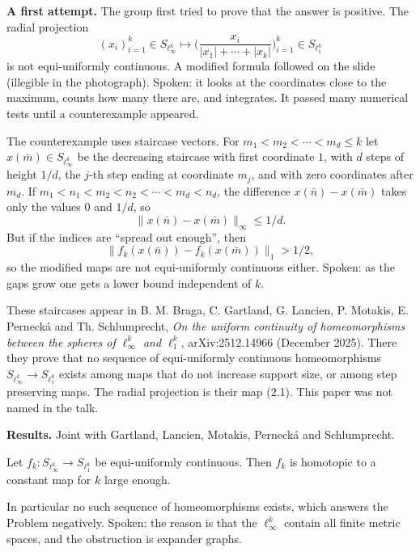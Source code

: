 \medskip\noindent
{\bf A first attempt.} The group first tried
to prove that the answer is positive. The
radial projection
$$
(x_i)_{i=1}^k \in S_{\ell_\infty^k}
\mapsto
\Big(\frac{x_i}{|x_1| + \cdots + |x_k|}
\Big)_{i=1}^k
\in S_{\ell_1^k}
$$
is not equi-uniformly continuous. A modified
formula followed on the slide (illegible in
the photograph). Spoken: it looks at the
coordinates close to the maximum, counts how
many there are, and integrates. It passed
many numerical tests until a counterexample
appeared.

The counterexample uses staircase vectors.
For $m_1 < m_2 < \cdots < m_d \le k$ let
$x(\bar m) \in S_{\ell_\infty^k}$ be the
decreasing staircase with first coordinate
$1$, with $d$ steps of height $1/d$, the
$j$-th step ending at coordinate $m_j$, and
with zero coordinates after $m_d$. If
$m_1 < n_1 < m_2 < n_2 < \cdots < m_d < n_d$,
the difference $x(\bar n) - x(\bar m)$ takes
only the values $0$ and $1/d$, so
$$
\|x(\bar n) - x(\bar m)\|_\infty \le 1/d.
$$
But if the indices are ``spread out
enough'', then
$$
\|f_k(x(\bar n)) - f_k(x(\bar m))\|_1
> 1/2,
$$
so the modified maps are not equi-uniformly
continuous either. Spoken: as the gaps grow
one gets a lower bound independent of $k$.

\begin{remark}
\label{remark-first-paper-staircase}
These staircases appear in B. M. Braga,
C. Gartland, G. Lancien, P. Motakis,
E. Perneck\'a and Th. Schlumprecht, \emph{On
the uniform continuity of homeomorphisms
between the spheres of $\ell_\infty^k$ and
$\ell_1^k$}, arXiv:2512.14966 (December
2025). There they prove that no sequence of
equi-uniformly continuous homeomorphisms
$S_{\ell_\infty^k} \to S_{\ell_1^k}$ exists
among maps that do not increase support size,
or among step preserving maps. The radial
projection is their map (2.1). This paper was
not named in the talk.
\end{remark}

\medskip\noindent
{\bf Results.} Joint with Gartland, Lancien,
Motakis, Pernecká and Schlumprecht.

\begin{theorem}
\label{theorem-braga-et-al-null-homotopic}
Let
$f_k : S_{\ell_\infty^k} \to S_{\ell_1^k}$
be equi-uniformly continuous. Then $f_k$ is
homotopic to a constant map for $k$ large
enough.
\end{theorem}

\noindent
In particular no such sequence of
homeomorphisms exists, which answers the
Problem negatively. Spoken: the reason is
that the $\ell_\infty^k$ contain all finite
metric spaces, and the obstruction is
expander graphs.

